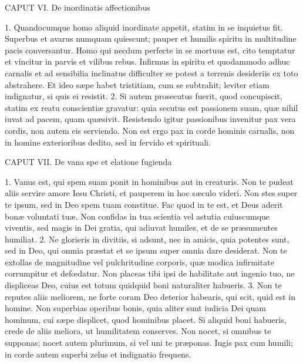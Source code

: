 CAPUT VI.
De inordinatis affectionibus

1. Quandocumque homo aliquid inordinate appetit, statim in se inquietus fit. Superbus et avarus numquam quiescunt; pauper et humilis spiritu in multitudine pacis conversantur. Homo qui necdum perfecte in se mortuus est, cito temptatur et vincitur in parvis et vilibus rebus. Infirmus in spiritu et quodammodo adhuc carnalis et ad sensibilia inclinatus difficulter se potest a terrenis desideriis ex toto abstrahere. Et ideo sæpe habet tristitiam, cum se subtrahit; leviter etiam indignatur, si quis ei resistit.
2. Si autem prosecutus fuerit, quod concupiscit, statim ex reatu conscientiæ gravatur: quia secutus est passionem suam, quæ nihil iuvat ad pacem, quam quæsivit. Resistendo igitur passionibus invenitur pax vera cordis, non autem eis serviendo. Non est ergo pax in corde hominis carnalis, non in homine exterioribus dedito, sed in fervido et spirituali.


CAPUT VII.
De vana spe et elatione fugienda

1. Vanus est, qui spem suam ponit in hominibus aut in creaturis. Non te pudeat aliis servire amore Iesu Christi, et pauperem in hoc sæculo videri. Non stes super te ipsum, sed in Deo spem tuam constitue. Fac quod in te est, et Deus aderit bonæ voluntati tuæ. Non confidas in tua scientia vel astutia cuiuscumque viventis, sed magis in Dei gratia, qui adiuvat humiles, et de se præsumentes humiliat.
2. Ne glorieris in divitiis, si adsunt, nec in amicis, quia potentes sunt, sed in Deo, qui omnia præstat et se ipsum super omnia dare desiderat. Non te extollas de magnitudine vel pulchritudine corporis, quæ modica infirmitate corrumpitur et defœdatur. Non placeas tibi ipsi de habilitate aut ingenio tuo, ne displiceas Deo, cuius est totum quidquid boni naturaliter habueris.
3. Non te reputes aliis meliorem, ne forte coram Deo deterior habearis, qui scit, quid est in homine. Non superbias operibus bonis, quia aliter sunt iudicia Dei quam hominum, cui sæpe displicet, quod hominibus placet. Si aliquid boni habueris, crede de aliis meliora, ut humilitatem conserves. Non nocet, si omnibus te supponas; nocet autem plurimum, si vel uni te præponas. Iugis pax cum humili; in corde autem superbi zelus et indignatio frequens.


